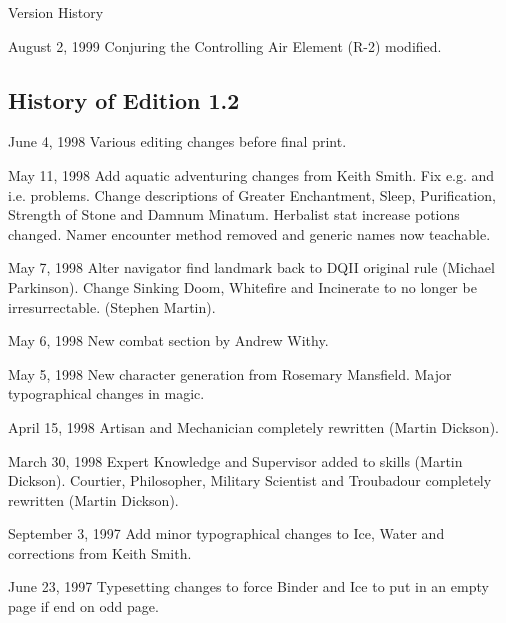 \begin{Chapter}{Version History}
\begin{Description}
\item[August 2, 1999] Conjuring the Controlling Air Element (R-2)
  modified.

\end{Description}

\subsection{History of Edition 1.2}

\begin{Description}

\item[June 4, 1998] Various editing changes before final print.

\item[May 11, 1998] Add aquatic adventuring changes from Keith Smith.
  Fix e.g. and i.e.  problems.  Change descriptions of Greater
  Enchantment, Sleep, Purification, Strength of Stone and Damnum
  Minatum.  Herbalist stat increase potions changed.  Namer encounter
  method removed and generic names now teachable.

\item[May 7, 1998] Alter navigator find landmark back to DQII original
  rule (Michael Parkinson).  Change Sinking Doom, Whitefire and
  Incinerate to no longer be irresurrectable. (Stephen Martin).

\item[May 6, 1998] New combat section by Andrew Withy.

\item[May 5, 1998] New character generation from Rosemary
  Mansfield. Major typographical changes in magic.

\item[April 15, 1998] Artisan and Mechanician completely rewritten
  (Martin Dickson).

\item[March 30, 1998] Expert Knowledge and Supervisor added to skills
  (Martin Dickson).  Courtier, Philosopher, Military Scientist and
  Troubadour completely rewritten (Martin Dickson).

\item[September 3, 1997] Add minor typographical changes to Ice, Water
  and corrections from Keith Smith.

\item[June 23, 1997] Typesetting changes to force Binder and Ice to
  put in an empty page if end on odd page.

\end{Description}


\end{Chapter}

